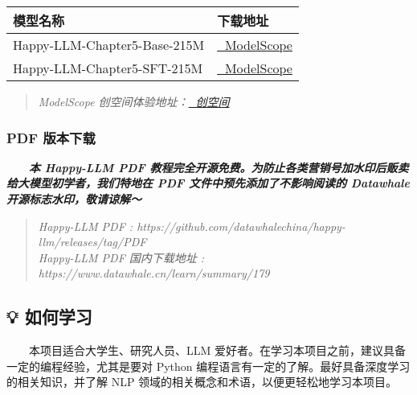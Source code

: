 \documentclass[
]{article}
\begin{document}
\begin{longtable}[]{@{}
  >{\raggedright\arraybackslash}p{}
  >{\raggedright\arraybackslash}p{}@{}}
\toprule\noalign{}
\begin{minipage}[b]{\linewidth}\raggedright
模型名称
\end{minipage} & \begin{minipage}[b]{\linewidth}\raggedright
下载地址
\end{minipage} \\
\midrule\noalign{}
\endhead
\bottomrule\noalign{}
\endlastfoot
Happy-LLM-Chapter5-Base-215M &
\href{https://www.modelscope.cn/models/kmno4zx/happy-llm-215M-base}{🤖
ModelScope} \\
Happy-LLM-Chapter5-SFT-215M &
\href{https://www.modelscope.cn/models/kmno4zx/happy-llm-215M-sft}{🤖
ModelScope} \\
\end{longtable}

\begin{quote}
\emph{ModelScope
创空间体验地址：\href{https://www.modelscope.cn/studios/kmno4zx/happy_llm_215M_sft}{🤖
创空间}}
\end{quote}

\subsubsection{PDF 版本下载}\label{pdf-ux7248ux672cux4e0bux8f7d}

  \textbf{\emph{本 Happy-LLM PDF
教程完全开源免费。为防止各类营销号加水印后贩卖给大模型初学者，我们特地在
PDF 文件中预先添加了不影响阅读的 Datawhale 开源标志水印，敬请谅解～}}

\begin{quote}
\emph{Happy-LLM PDF :
https://github.com/datawhalechina/happy-llm/releases/tag/PDF}\\
\emph{Happy-LLM PDF 国内下载地址 :
https://www.datawhale.cn/learn/summary/179}
\end{quote}

\subsection{💡 如何学习}\label{ux5982ux4f55ux5b66ux4e60}

  本项目适合大学生、研究人员、LLM
爱好者。在学习本项目之前，建议具备一定的编程经验，尤其是要对 Python
编程语言有一定的了解。最好具备深度学习的相关知识，并了解 NLP
领域的相关概念和术语，以便更轻松地学习本项目。
\end{document}
